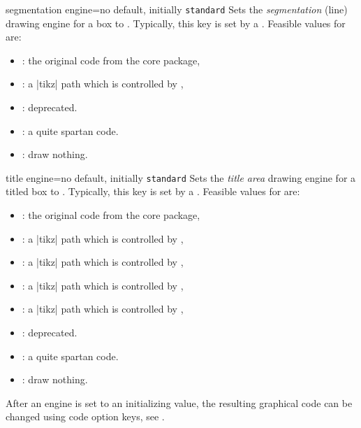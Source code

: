 \begin{docTcbKey}{segmentation engine}{=}{no default, initially \texttt{standard}}
  Sets the \emph{segmentation} (line) drawing engine for a box to .
  Typically, this key is set by a .
  Feasible values for  are:
  \begin{itemize}
  \item{}: the original code from the core package,
  \item{}: a |tikz| path which is controlled by ,
  \item{}: deprecated.
  \item{}: a quite spartan code.
  \item{}: draw nothing.
  \end{itemize}
\end{docTcbKey}

\begin{docTcbKey}{title engine}{=}{no default, initially \texttt{standard}}
  Sets the \emph{title area} drawing engine for a titled box to .
  Typically, this key is set by a .
  Feasible values for  are:
  \begin{itemize}
  \item{}: the original code from the core package,
  \item{}: a |tikz| path which is controlled by ,
  \item{}: a |tikz| path which is controlled by ,
  \item{}: a |tikz| path which is controlled by ,
  \item{}: a |tikz| path which is controlled by ,
  \item{}: deprecated.
  \item{}: a quite spartan code.
  \item{}: draw nothing.
  \end{itemize}
\end{docTcbKey}

\begin{marker}
After an engine is set to an initializing value, the resulting graphical
code can be changed using code option keys, see .
\end{marker}

